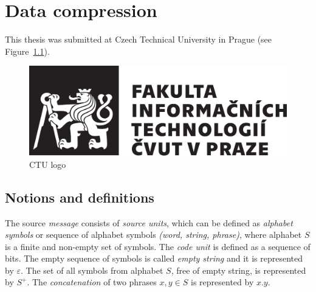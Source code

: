 \documentclass[thesis=M,english]{FITthesis}[2019/12/23]
\begin{document}
\begin{introduction}
\end{introduction}

\chapter{Data compression}\label{textcompr}

	This thesis was submitted at Czech Technical University in Prague (see Figure~\ref{fig:logo}).
	
	\begin{figure}\centering
		\includegraphics{cvut-logo-bw}
		\caption{CTU logo}\label{fig:logo}
	\end{figure}

\section{Notions and definitions}

The source \textit{message} consists of \textit{source units}, which can be defined as \textit{alphabet symbols} or sequence of alphabet symbols \textit{(word, string, phrase)}, where alphabet $S$ is a finite and non-empty set of symbols. The \textit{code unit} is defined as a sequence of bits. The empty sequence of symbols is called \textit{empty string} and it is represented by $\varepsilon$. The set of all symbols from alphabet $S$, free of empty string, is represented by $S^+$. The \textit{concatenation} of two phrases $x,y \in S$ is represented by $x.y$.
\end{document}
